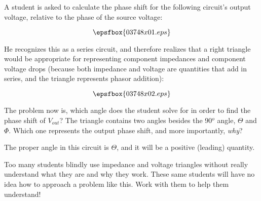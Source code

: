 

A student is asked to calculate the phase shift for the following circuit's output voltage, relative to the phase of the source voltage:

$$\epsfbox{03748x01.eps}$$

He recognizes this as a series circuit, and therefore realizes that a right triangle would be appropriate for representing component impedances and component voltage drops (because both impedance and voltage are quantities that add in series, and the triangle represents phasor addition):

$$\epsfbox{03748x02.eps}$$

The problem now is, which angle does the student solve for in order to find the phase shift of $V_{out}$?  The triangle contains two angles besides the 90$^{o}$ angle, $\Theta$ and $\Phi$.  Which one represents the output phase shift, and more importantly, {\it why}?







The proper angle in this circuit is $\Theta$, and it will be a positive (leading) quantity.







Too many students blindly use impedance and voltage triangles without really understand what they are and why they work.  These same students will have no idea how to approach a problem like this.  Work with them to help them understand!




